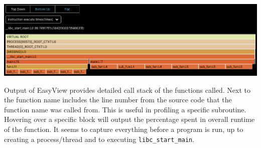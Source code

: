 \documentclass[11pt]{article}
\begin{document}
\centerline{\includegraphics[width=6in]{figures/easyview.png}}

Output of EasyView provides detailed call stack of the functions called. Next to the function name includes the line number from the source code that the function name was called from. This is useful in profiling a specific subroutine. Hovering over a specific block will output the percentage spent in overall runtime of the function. It seems to capture everything before a program is run, up to creating a process/thread and to executing \verb|libc_start_main|.
\end{document}
